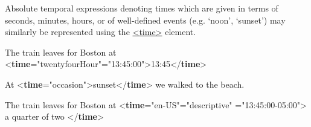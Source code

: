 Absolute temporal expressions denoting times which are given in terms of seconds, minutes, hours, or of well-defined events (e.g. ‘noon’, ‘sunset’) may similarly be represented using the \hyperref[TEI.time]{<time>} element. \par\bgroup{}\exampleFont \begin{shaded}\noindent\mbox{}The train leaves for Boston at {<\textbf{time}\hspace*{1em}{type}="{twentyfourHour}"\hspace*{1em}{when}="{13:45:00}">}13:45{</\textbf{time}>}\end{shaded}\egroup\par \noindent  \par\bgroup{}\exampleFont \begin{shaded}\noindent\mbox{}At {<\textbf{time}\hspace*{1em}{type}="{occasion}">}sunset{</\textbf{time}>} we walked to the beach.\end{shaded}\egroup\par \noindent  \par\bgroup{}\exampleFont \begin{shaded}\noindent\mbox{}The train leaves for Boston at {<\textbf{time}\hspace*{1em}{xml:lang}="{en-US}"\hspace*{1em}{type}="{descriptive}"\mbox{}\newline 
\hspace*{1em}{when}="{13:45:00-05:00}">} a quarter of two {</\textbf{time}>}\end{shaded}\egroup\par 
